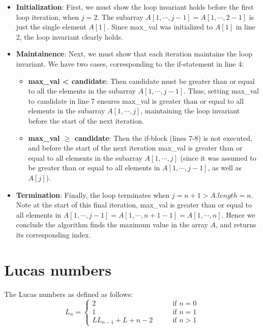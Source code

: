 \documentclass[paper=a4, fontsize=11pt]{scrartcl} %
\numberwithin{equation}{section} %
\numberwithin{figure}{section} %
\numberwithin{table}{section} %
\begin{document}
\begin{itemize}
\item \textbf{Initialization}: First, we must show the loop invariant holds before the first loop iteration, when $j = 2$. The subarray $A[1, \cdots, j - 1] = A[1, \cdots, 2 - 1]$ is just the single element $A[1]$. Since max\_val was initialized to $A[1]$ in line 2, the loop invariant clearly holds.
\item \textbf{Maintainence}: Next, we must show that each iteration maintains the loop invariant. We have two cases, corresponding to the if-statement in line 4:
\begin{itemize}
\item \textbf{max\_val < candidate}: Then candidate must be greater than or equal to all the elements in the subarray $A[1, \cdots, j-1]$. Thus, setting max\_val to candidate in line 7 ensures max\_val is greater than or equal to all elements in the subarray $A[1, \cdots, j]$, maintaining the loop invariant before the start of the next iteration.
\item \textbf{max\_val $\geq$ candidate}: Then the if-block (lines 7-8) is not executed, and before the start of the next iteration max\_val is greater than or equal to all elements in the subarray $A[1, \cdots, j]$ (since it was assumed to be greater than or equal to all elements in $A[1, \cdots, j-1]$, as well as $A[j]$).
\end{itemize}
\item \textbf{Termination}: Finally, the loop terminates when $j = n + 1 > A.length = n$. Note at the start of this final iteration, max\_val is greater than or equal to all elements in $A[1, \cdots, j - 1] = A[1, \cdots, n + 1 - 1] = A[1, \cdots, n]$. Hence we conclude the algorithm finds the maximum value in the array $A$, and returns its corresponding index.
\end{itemize}


\section{Lucas numbers}

The Lucas numbers as defined as follows:
\[
L_n =
\begin{cases}
2 & \qquad{} \textrm{if } n=0\\
1 & \qquad{} \textrm{if } n=1\\L
L_{n-1} + L+{n-2} & \qquad{} \textrm{if } n>1
\end{cases}
\]
\end{document}
